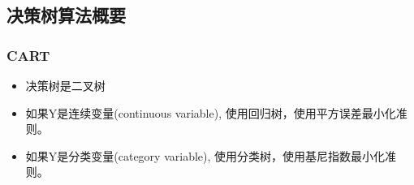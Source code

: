 \subsection{决策树算法概要}

\subsubsection{CART}
\begin{itemize}
    \item 决策树是二叉树
    \item 如果Y是连续变量(continuous variable), 使用回归树，使用平方误差最小化准则。
    \item 如果Y是分类变量(category variable), 使用分类树，使用基尼指数最小化准则。
\end{itemize}
